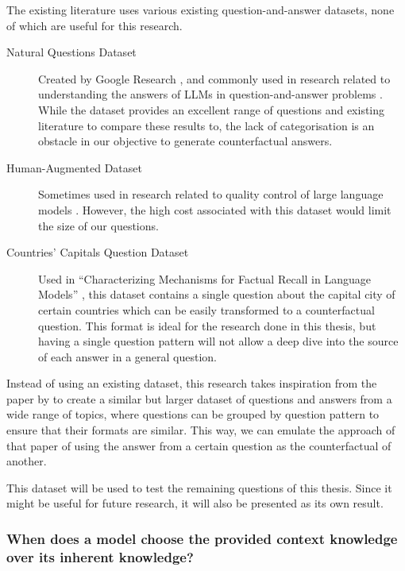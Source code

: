 The existing literature uses various existing question-and-answer datasets, none of which are useful for this research.\footnotemark{}
\begin{description}
	\item[Natural Questions Dataset] Created by Google Research \citep{natural_questions}, and commonly used in research related to understanding the answers of LLMs in question-and-answer problems \citep{ragged,when_not_to_trust_llms,can_rag_models_reason}.
		While the dataset provides an excellent range of questions and existing literature to compare these results to, the lack of categorisation is an obstacle in our objective to generate counterfactual answers.
	\item[Human-Augmented Dataset] Sometimes used in research related to quality control of large language models \citep{learning_the_difference}.
		However, the high cost associated with this dataset would limit the size of our questions.
	\item[Countries' Capitals Question Dataset] Used in ``Characterizing Mechanisms for Factual Recall in Language Models'' \citep{factual_recall}, this dataset contains a single question about the capital city of certain countries which can be easily transformed to a counterfactual question.
		This format is ideal for the research done in this thesis, but having a single question pattern will not allow a deep dive into the source of each answer in a general question.
\end{description}

Instead of using an existing dataset, this research takes inspiration from the paper by \citeauthor{factual_recall} to create a similar but larger dataset of questions and answers from a wide range of topics, where questions can be grouped by question pattern to ensure that their formats are similar.
This way, we can emulate the approach of that paper of using the answer from a certain question as the counterfactual of another.

This dataset will be used to test the remaining questions of this thesis.
Since it might be useful for future research, it will also be presented as its own result.


\subsubsection{When does a model choose the provided context knowledge over its inherent knowledge?}

